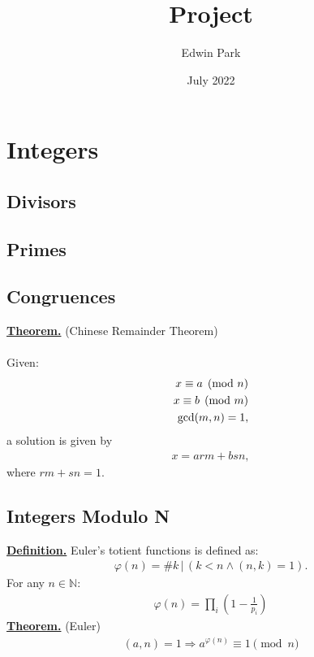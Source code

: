 \documentclass{article}
\title{Project}
\author{Edwin Park}
\date{July 2022}
\renewcommand\({\left(}
\renewcommand\){\right)}
\begin{document}
\clearpage\maketitle\thispagestyle{empty}
\newpage
\tableofcontents
\newpage\setcounter{page}{1}

\section{Integers}
\subsection{Divisors}
\subsection{Primes}
\subsection{Congruences}
\underline{\textbf{Theorem.}} (Chinese Remainder Theorem)
\\
\vspace{2mm}
\\
Given:
\begin{align*}
    x\equiv a\pmod{n}\\
    x\equiv b\pmod{m}\\
    \textnormal{gcd}(m,n)=1,
\end{align*}
a solution is given by
\begin{align*}
    x=arm+bsn,
\end{align*}
where $rm+sn=1$.

\vspace{24mm}
\subsection{Integers Modulo N}
\underline{\textbf{Definition.}} Euler's totient functions is defined as:
\begin{align*}
    \varphi(n)=\#k\,|\,(k<n\land (n,k)=1).
\end{align*}
For any $n\in\mathbb{N}$:
\begin{align*}
    \varphi(n)=\prod_{i}{\left(1-\frac{1}{p_i}\right)}
\end{align*}
\underline{\textbf{Theorem.}} (Euler)
\begin{align*}
    (a,n)=1\Rightarrow a^{\varphi(n)}\equiv 1\pmod{n}
\end{align*}
\newpage
\end{document}
